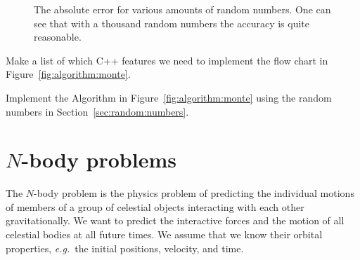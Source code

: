 \begin{figure}[tb]
\centering
{}
\caption{The absolute error for various amounts of random numbers. One can see that with a thousand random numbers the accuracy is quite reasonable. }
\label{fig:monte:carlo}
\end{figure}

\begin{exercise}
Make a list of which C++ features we need to implement the flow chart in Figure~\ref{fig:algorithm:monte}.
\end{exercise}

\begin{exercise}
Implement the Algorithm in Figure~\ref{fig:algorithm:monte} using the random numbers in Section~\ref{sec:random:numbers}.
\end{exercise}


\chapter{$N$-body problems}
\label{sec:nbody}
The $N$-body problem is the physics problem of predicting the individual motions of members of a group of celestial objects interacting with each other gravitationally. We want to predict the interactive forces and the motion of all celestial bodies at all future times. We assume that we know their orbital properties, \emph{e.g.}\ the initial positions, velocity, and time.\\

